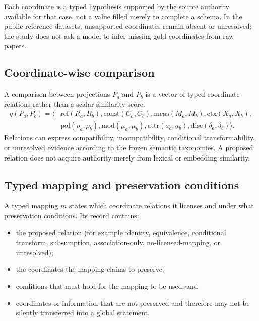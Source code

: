 Each coordinate is a typed hypothesis supported by the source authority
available for that case, not a value filled merely to complete a schema. In
the public-reference datasets, unsupported coordinates remain absent or
unresolved; the study does not ask a model to infer missing gold coordinates
from raw papers.

\subsection{Coordinate-wise comparison}

A comparison between projections $P_a$ and $P_b$ is a vector of typed
coordinate relations rather than a scalar similarity score:
\begin{equation}
\begin{split}
    q(P_a,P_b) = \langle &\mathrm{ref}(R_a,R_b),
    \mathrm{const}(C_a,C_b),
    \mathrm{meas}(M_a,M_b),
    \mathrm{ctx}(X_a,X_b),\\
    &\mathrm{pol}(\rho_a,\rho_b),
    \mathrm{mod}(\mu_a,\mu_b),
    \mathrm{attr}(a_a,a_b),
    \mathrm{disc}(\delta_a,\delta_b) \rangle .
\end{split}
\end{equation}
Relations can express compatibility, incompatibility, conditional
transformability, or unresolved evidence according to the frozen semantic
taxonomies. A proposed relation does not acquire authority merely from lexical
or embedding similarity.

\subsection{Typed mapping and preservation conditions}

A typed mapping $m$ states which coordinate relations it licenses and under
what preservation conditions. Its record contains:

\begin{itemize}
    \item the proposed relation (for example identity, equivalence,
          conditional transform, subsumption, association-only,
          no-licensed-mapping, or unresolved);
    \item the coordinates the mapping claims to preserve;
    \item conditions that must hold for the mapping to be used; and
    \item coordinates or information that are not preserved and therefore may
          not be silently transferred into a global statement.
\end{itemize}

